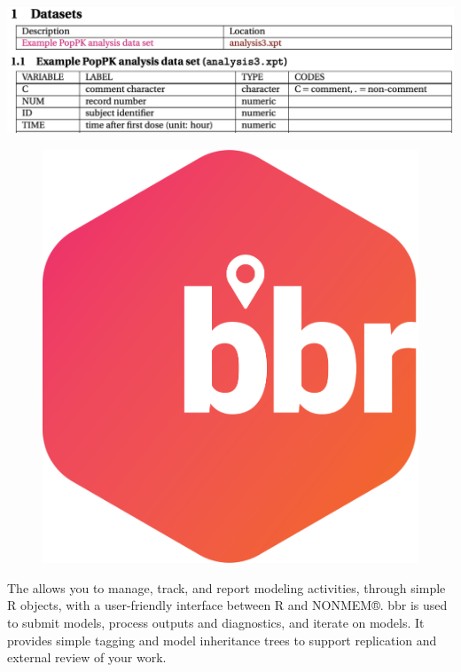 \documentclass[portrait,fontscale=0.46,paperwidth=36in,paperheight=48in]{baposter}
\begin{document}
\begin{poster}
{\begin{minipage}[c]{0.333\linewidth}
\begin{demobx}[]
	\includegraphics[scale=0.25]{"images/define.png"} 

	\end{demobx}	
\end{minipage} %
\begin{minipage}[c]{0.333\linewidth}
	\begin{demobx}[]
		\begin{figure}
			\vspace{-0.45cm}
			\includegraphics[scale=0.15]{"images/metrum_bbr_git_logo.png"} 
		\end{figure}
		The  allows you to manage, track, and report modeling activities, through simple R objects, with a user-friendly interface between R and NONMEM®. 
		bbr is used to submit models, process outputs and diagnostics, and iterate on models. It provides simple tagging and model inheritance trees to support replication and external review of your work.
		

\end{demobx}
\end{minipage}}
\end{poster}
\end{document}
